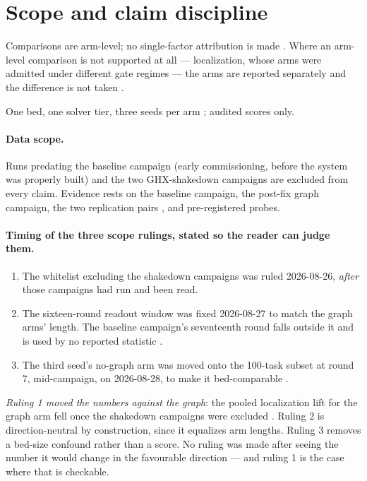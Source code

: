 \section{Scope and claim discipline}
\label{sec:scope}

Comparisons are arm-level; no single-factor attribution is made .
Where an arm-level comparison is not supported at all --- localization,
whose arms were admitted under different gate regimes --- the arms are
reported separately and the difference is not taken .

One bed, one solver tier, three seeds per arm ; audited scores
only.

\paragraph{Data scope.} Runs predating the baseline campaign (early
commissioning, before the system was properly built) and the two
GHX-shakedown campaigns are excluded from every claim. Evidence rests on
the baseline campaign, the post-fix graph campaign, the two replication
pairs , and pre-registered probes.

\paragraph{Timing of the three scope rulings, stated so the reader can
judge them.}
\begin{enumerate}
  \item The whitelist excluding the shakedown campaigns was ruled
        2026-08-26, \emph{after} those campaigns had run and been read.
  \item The sixteen-round readout window was fixed 2026-08-27 to match the
        graph arms' length. The baseline campaign's seventeenth round falls
        outside it and is used by no reported statistic .
  \item The third seed's no-graph arm was moved onto the 100-task subset at
        round 7, mid-campaign, on 2026-08-28, to make it bed-comparable
        .
\end{enumerate}

\emph{Ruling 1 moved the numbers against the graph}: the pooled
localization lift for the graph arm fell once the shakedown campaigns were
excluded . Ruling 2 is direction-neutral by construction, since it
equalizes arm lengths. Ruling 3 removes a bed-size confound rather than a
score. No ruling was made after seeing the number it would change in the
favourable direction --- and ruling 1 is the case where that is checkable.

